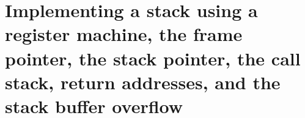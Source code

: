 
\chapter{Implementing a stack using a register machine, the frame pointer, the stack pointer, the call stack, return addresses, and the stack buffer overflow}
